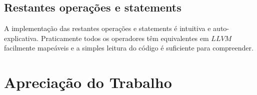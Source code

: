 \documentclass[11pt,a4paper]{article}
\begin{document}
\subsection{Restantes operações e statements}

A implementação das restantes operações e statements é intuitiva e auto-explicativa. Praticamente todos os operadores têm equivalentes em $LLVM$ facilmente mapeáveis e a simples leitura do código é suficiente para compreender.

\pagebreak

\section{Apreciação do Trabalho}
\end{document}

